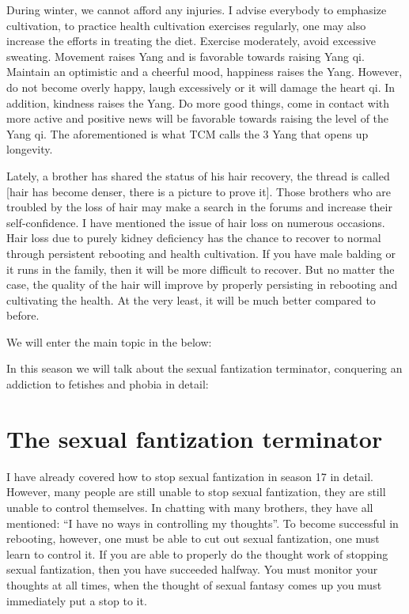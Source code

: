 \documentclass[
]{book}
\begin{document}
During winter, we cannot afford any injuries. I advise everybody to emphasize cultivation, to practice health cultivation exercises regularly, one may also increase the efforts in treating the diet. Exercise moderately, avoid excessive sweating. Movement raises Yang and is favorable towards raising Yang qi. Maintain an optimistic and a cheerful mood, happiness raises the Yang. However, do not become overly happy, laugh excessively or it will damage the heart qi. In addition, kindness raises the Yang. Do more good things, come in contact with more active and positive news will be favorable towards raising the level of the Yang qi. The aforementioned is what TCM calls the 3 Yang that opens up longevity.

Lately, a brother has shared the status of his hair recovery, the thread is called {[}hair has become denser, there is a picture to prove it{]}. Those brothers who are troubled by the loss of hair may make a search in the forums and increase their self-confidence. I have mentioned the issue of hair loss on numerous occasions. Hair loss due to purely kidney deficiency has the chance to recover to normal through persistent rebooting and health cultivation. If you have male balding or it runs in the family, then it will be more difficult to recover. But no matter the case, the quality of the hair will improve by properly persisting in rebooting and cultivating the health. At the very least, it will be much better compared to before.

We will enter the main topic in the below:

In this season we will talk about the sexual fantization terminator, conquering an addiction to fetishes and phobia in detail:

\hypertarget{the-sexual-fantization-terminator}{%
\section{The sexual fantization terminator}\label{the-sexual-fantization-terminator}}

I have already covered how to stop sexual fantization in season 17 in detail. However, many people are still unable to stop sexual fantization, they are still unable to control themselves. In chatting with many brothers, they have all mentioned: ``I have no ways in controlling my thoughts''. To become successful in rebooting, however, one must be able to cut out sexual fantization, one must learn to control it. If you are able to properly do the thought work of stopping sexual fantization, then you have succeeded halfway. You must monitor your thoughts at all times, when the thought of sexual fantasy comes up you must immediately put a stop to it.
\end{document}
